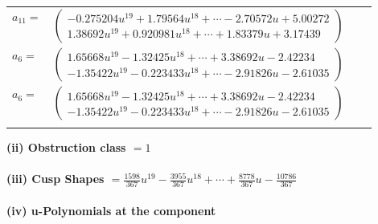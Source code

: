 \documentclass[1p]{elsarticle_modified}
\theoremstyle{definition}
\begin{document}
\begin{tabular}{m{7pt} m{180pt} m{7pt} m{180pt} }
\flushright $a_{11}=$&$\begin{pmatrix}-0.275204 u^{19}+1.79564 u^{18}+\cdots-2.70572 u+5.00272\\1.38692 u^{19}+0.920981 u^{18}+\cdots+1.83379 u+3.17439\end{pmatrix}$ \\
\flushright $a_{6}=$&$\begin{pmatrix}1.65668 u^{19}-1.32425 u^{18}+\cdots+3.38692 u-2.42234\\-1.35422 u^{19}-0.223433 u^{18}+\cdots-2.91826 u-2.61035\end{pmatrix}$\\ \flushright $a_{6}=$&$\begin{pmatrix}1.65668 u^{19}-1.32425 u^{18}+\cdots+3.38692 u-2.42234\\-1.35422 u^{19}-0.223433 u^{18}+\cdots-2.91826 u-2.61035\end{pmatrix}$\\&\end{tabular}
\flushleft \textbf{(ii) Obstruction class $= 1$}\\~\\
\flushleft \textbf{(iii) Cusp Shapes $= \frac{1598}{367} u^{19}-\frac{3955}{367} u^{18}+\cdots+\frac{8778}{367} u-\frac{10786}{367}$}\\~\\
\newpage\renewcommand{\arraystretch}{1}
\flushleft \textbf{(iv) u-Polynomials at the component}\newline \\
\end{document}
